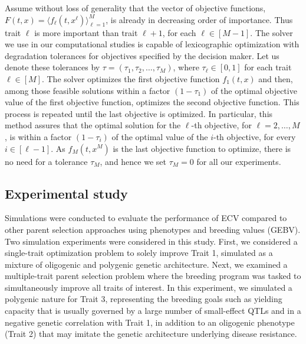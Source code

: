 \documentclass[12pt, a4paper, bibliography=totoc]{scrartcl}
\newtheorem{proposition}{Proposition}
\begin{document}
Assume without loss of generality that the vector of objective functions, $F(t,x)=\langle f_{\ell}(t,x^\ell)\rangle_{\ell=1}^{M}$, is already in decreasing order of importance. Thus trait $\ell$ is more important than trait $\ell+1$, for each $\ell\in[M-1]$. The  solver we use in our computational studies is capable of  lexicographic optimization with degradation tolerances for objectives  specified by the decision maker. Let us denote these tolerances by $\tau = (\tau_1,\tau_2,\dots,\tau_M)$, where $ \tau_\ell\in [0, 1]$ for each trait $\ell\in[M]$. The solver optimizes the first objective function $f_1(t,x)$ and then, among those feasible solutions within a factor $(1-\tau_1)$ of the optimal objective value of the first objective function, optimizes the second objective function. This process is repeated until the last objective is optimized. In particular, this method assures that the optimal solution for the $\ell$-th objective, for $\ell=2,\ldots,M$, is within a factor  $(1-\tau_i)$ of the optimal value of the $i$-th objective, for every  $i\in[\ell-1]$. As $f_{M}(t,x^M)$ is the last objective function to optimize, there is no need for a tolerance $\tau_M$, and hence we set $\tau_M=0$ for all our experiments.





 
\subsection*{Experimental study}

Simulations were conducted to evaluate the performance of ECV compared to other parent selection approaches using phenotypes and breeding values (GEBV). Two simulation experiments were considered in this study. First, we considered a single-trait optimization problem to solely improve Trait 1, simulated as a mixture of oligogenic and polygenic genetic architecture. Next, we examined a multiple-trait parent selection problem where the breeding program was tasked to simultaneously improve all traits of interest. In this experiment, we simulated a polygenic nature for Trait 3, representing the breeding goals such as yielding capacity that is usually governed by a large number of small-effect QTLs and in a negative genetic correlation with Trait 1, in addition to an oligogenic phenotype (Trait 2) that may imitate the genetic architecture underlying disease resistance. 
\end{document}
